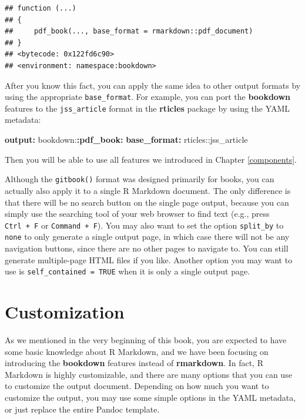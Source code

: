 \documentclass[
  12pt,
]{krantz}
\newenvironment{Shaded}{\begin{snugshade}}{\end{snugshade}}
\newcommand{\AttributeTok}[1]{\textcolor[rgb]{0.13,0.29,0.53}{#1}}
\newcommand{\FunctionTok}[1]{\textcolor[rgb]{0.13,0.29,0.53}{\textbf{#1}}}
\newcommand{\KeywordTok}[1]{\textcolor[rgb]{0.13,0.29,0.53}{\textbf{#1}}}
\newcounter{none} %
\theoremstyle{definition}
\theoremstyle{definition}
\theoremstyle{definition}
\theoremstyle{definition}
\theoremstyle{remark}
\begin{document}
\begin{verbatim}
## function (...) 
## {
##     pdf_book(..., base_format = rmarkdown::pdf_document)
## }
## <bytecode: 0x122fd6c90>
## <environment: namespace:bookdown>
\end{verbatim}

After you know this fact, you can apply the same idea to other output formats by using the appropriate \texttt{base\_format}. For example, you can port the \textbf{bookdown} features to the \texttt{jss\_article} format in the \textbf{rticles} package \citep{R-rticles} by using the YAML metadata:

\begin{Shaded}
\begin{Highlighting}[]
\FunctionTok{output}\KeywordTok{:}
\AttributeTok{  bookdown:}\FunctionTok{:pdf\_book}\KeywordTok{:}
\AttributeTok{    }\FunctionTok{base\_format}\KeywordTok{:}\AttributeTok{ rticles::jss\_article}
\end{Highlighting}
\end{Shaded}

Then you will be able to use all features we introduced in Chapter \ref{components}.

Although the \texttt{gitbook()} format was designed primarily for books, you can actually also apply it to a single R Markdown document. The only difference is that there will be no search button on the single page output, because you can simply use the searching tool of your web browser to find text (e.g., press \texttt{Ctrl\ +\ F} or \texttt{Command\ +\ F}). You may also want to set the option \texttt{split\_by} to \texttt{none} to only generate a single output page, in which case there will not be any navigation buttons, since there are no other pages to navigate to. You can still generate multiple-page HTML files if you like. Another option you may want to use is \texttt{self\_contained\ =\ TRUE} when it is only a single output page.

\chapter{Customization}\label{customization}

As we mentioned in the very beginning of this book, you are expected to have some basic knowledge about R Markdown, and we have been focusing on introducing the \textbf{bookdown} features instead of \textbf{rmarkdown}. In fact, R Markdown is highly customizable, and there are many options that you can use to customize the output document. Depending on how much you want to customize the output, you may use some simple options in the YAML metadata, or just replace the entire Pandoc template.
\end{document}

